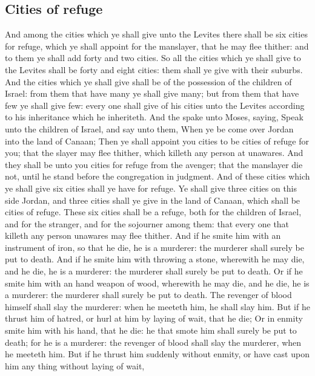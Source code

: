 \begin{biblechapter}
\section*{Cities of refuge}
\verse And among the cities which ye shall give unto the Levites there shall be six cities for refuge, which ye shall appoint for the manslayer, that he may flee thither: and to them ye shall add forty and two cities.
\verse So all the cities which ye shall give to the Levites shall be forty and eight cities: them shall ye give with their suburbs.
\verse And the cities which ye shall give shall be of the possession of the children of Israel: from them that have many ye shall give many; but from them that have few ye shall give few: every one shall give of his cities unto the Levites according to his inheritance which he inheriteth.
\verse And the \LORD spake unto Moses, saying,
\verse Speak unto the children of Israel, and say unto them, When ye be come over Jordan into the land of Canaan;
\verse Then ye shall appoint you cities to be cities of refuge for you; that the slayer may flee thither, which killeth any person at unawares.
\verse And they shall be unto you cities for refuge from the avenger; that the manslayer die not, until he stand before the congregation in judgment.
\verse And of these cities which ye shall give six cities shall ye have for refuge.
\verse Ye shall give three cities on this side Jordan, and three cities shall ye give in the land of Canaan, which shall be cities of refuge.
\verse These six cities shall be a refuge, both for the children of Israel, and for the stranger, and for the sojourner among them: that every one that killeth any person unawares may flee thither.
\verse And if he smite him with an instrument of iron, so that he die, he is a murderer: the murderer shall surely be put to death.
\verse And if he smite him with throwing a stone, wherewith he may die, and he die, he is a murderer: the murderer shall surely be put to death.
\verse Or if he smite him with an hand weapon of wood, wherewith he may die, and he die, he is a murderer: the murderer shall surely be put to death.
\verse The revenger of blood himself shall slay the murderer: when he meeteth him, he shall slay him.
\verse But if he thrust him of hatred, or hurl at him by laying of wait, that he die;
\verse Or in enmity smite him with his hand, that he die: he that smote him shall surely be put to death; for he is a murderer: the revenger of blood shall slay the murderer, when he meeteth him.
\verse But if he thrust him suddenly without enmity, or have cast upon him any thing without laying of wait,

\end{biblechapter}
